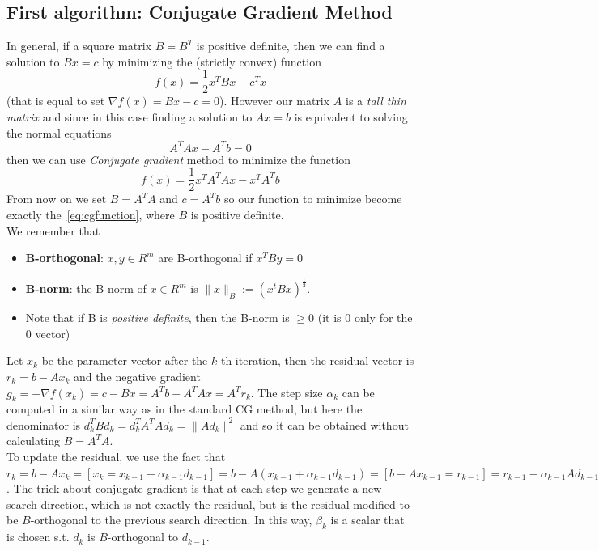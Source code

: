 \documentclass{article}
\begin{document}
\subsection{First algorithm: Conjugate Gradient Method}\label{subsec:conjugate-gradient-method}
In general, if a square matrix $B = B^{T}$ is positive definite, then we can find a solution to $Bx = c$ by minimizing the (strictly convex) function 
\begin{equation}\label{eq:cgfunction}
f(x) = \frac{1}{2}x^{T}Bx - c^{T}x  
\end{equation}
(that is equal to set $\nabla f(x) = Bx - c = 0$).
However our matrix $A$ is a \emph{tall thin matrix} and since in this case finding a solution to  $Ax = b$ is equivalent to solving the normal equations
\[
A^{T}Ax - A^{T}b = 0
\]
then we can use \textit{Conjugate gradient} method to minimize the function
\[
f(x) = \frac{1}{2}x^{T}A^{T}Ax - x^{T}A^{T}b
\]
From now on we set $B = A^{T}A$ and $c = A^{T}b$ so our function to minimize become exactly the~\eqref{eq:cgfunction}, where $B$ is positive definite.
\\We remember that \begin{itemize}
\item \textbf{B-orthogonal}: $x, y \in R^{m}$ are B-orthogonal if $x^{T}By = 0$
\item \textbf{B-norm}: the B-norm of $x \in R^{m}$ is $\|x\|_{B} := (x^{t}Bx)^{\frac{1}{2}}$.
\item Note that if B is \textit{positive definite}, then the B-norm is $\geq 0$ (it is $0$ only for the $0$ vector)
\end{itemize}
Let $x_{k}$ be the parameter vector after the $k$-th iteration, then the residual vector is $r_{k} = b - Ax_{k}$ and the negative gradient $g_{k} = -\nabla f(x_{k}) = c - Bx = A^{T}b - A^{T}Ax = A^{T}r_{k}$.
The step size $\alpha_{k}$ can be computed in a similar way as in the standard CG method, but here the denominator is $d_{k}^{T}Bd_k= d_{k}^{T}A^{T}Ad_k = \|Ad_{k}\|^2$ and so it can be obtained without calculating $B = A^{T}A$.
\\To update the residual, we use the fact that $r_{k} = b - Ax_{k} = [x_{k} = x_{k-1} + \alpha_{k-1}d_{k-1}] = b - A(x_{k-1} + \alpha_{k-1}d_{k-1}) = [b-Ax_{k-1} = r_{k-1}] = r_{k-1} - \alpha_{k-1}Ad_{k-1}$.
The trick about conjugate gradient is that at each step we generate a new search direction, which is not exactly the residual, but is the residual modified to be $B$-orthogonal to the previous search direction.
In this way, $\beta_{k}$ is a scalar that is chosen s.t. $d_{k}$ is $B$-orthogonal to $d_{k-1}$.
\end{document}
